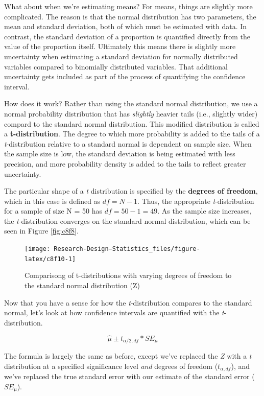 \documentclass[
]{book}
\begin{document}
What about when we're estimating means? For means, things are slightly more complicated. The reason is that the normal distribution has two parameters, the mean and standard deviation, both of which must be estimated with data. In contrast, the standard deviation of a proportion is quantified directly from the value of the proportion itself. Ultimately this means there is slightly more uncertainty when estimating a standard deviation for normally distributed variables compared to binomially distributed variables. That additional uncertainty gets included as part of the process of quantifying the confidence interval.

How does it work? Rather than using the standard normal distribution, we use a normal probability distribution that has \emph{slightly} heavier tails (i.e., slightly wider) compard to the standard normal distribution. This modified distribution is called a \textbf{t-distribution}. The degree to which more probability is added to the tails of a \emph{t}-distribution relative to a standard normal is dependent on sample size. When the sample size is low, the standard deviation is being estimated with less precision, and more probability density is added to the tails to reflect greater uncertainty.

The particular shape of a \emph{t} distribution is specified by the \textbf{degrees of freedom}, which in this case is defined as \(df=N-1\). Thus, the appropriate \emph{t}-distribution for a sample of size N = 50 has \(df = 50 - 1 = 49\). As the sample size increases, the \emph{t}-distribution converges on the standard normal distribution, which can be seen in Figure \ref{fig:c8f8}.

\begin{figure}

{\centering \texttt{[image: Research-Design---Statistics\_files/figure-latex/c8f10-1]} 

}

\caption{Comparisong of t-distributions with varying degrees of freedom to the standard normal distribution (Z)}\label{fig:c8f10}
\end{figure}

Now that you have a sense for how the \emph{t}-distribution compares to the standard normal, let's look at how confidence intervals are quantified with the \emph{t}-distribution.

\[
\hat{\mu}\pm t_{\alpha/2,df}*SE_\mu
\]

The formula is largely the same as before, except we've replaced the \emph{Z} with a \emph{t} distribution at a specified significance level \emph{and} degrees of freedom (\(t_{\alpha,df}\)), and we've replaced the true standard error with our estimate of the standard error (\(SE_\mu\)).
\end{document}
